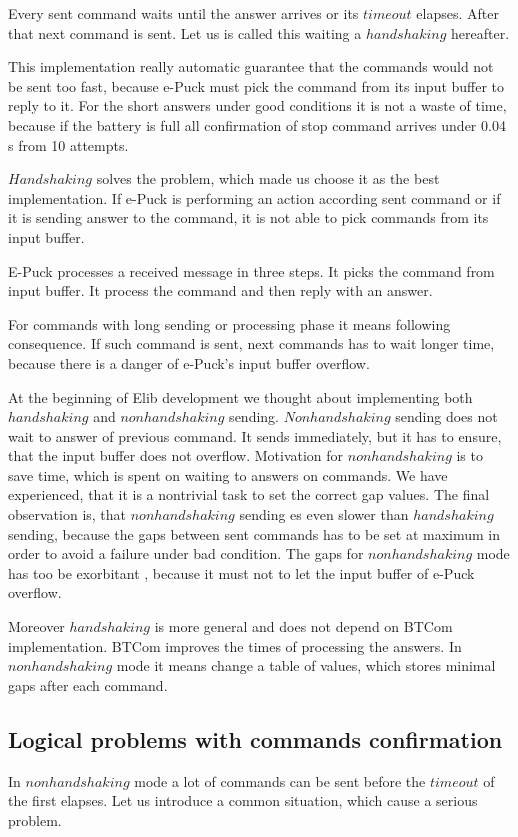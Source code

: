 	Every sent command waits until the answer arrives or its $timeout$ elapses.
	After that next command is sent. Let us is called this waiting a $handshaking$ hereafter.

	This implementation really automatic guarantee that the commands would not be sent too fast,
	because e-Puck must pick the command from its input buffer to reply to it.
	For the short answers under good conditions it is not a waste of time, because
	if the battery is full all confirmation of stop command arrives under 0.04 s from 10 attempts.

	$Handshaking$ solves the problem, which made us choose it as the best implementation.
	If e-Puck is performing an action according sent command or if it is sending answer to the command,
	it is not able to pick commands from its input buffer.

	E-Puck processes a received message in three steps. It picks the command from input buffer.
	It process the command and then reply with an answer.

	For commands with long sending or processing phase it means following consequence.
	If such command is sent, next commands has to wait longer time, because there is a
	danger of e-Puck's input buffer overflow.

	At the beginning of Elib development we thought about implementing both $handshaking$
	and $nonhandshaking$ sending.
	$Nonhandshaking$ sending does not wait to answer of previous command. It sends immediately, but 
	it has to ensure, that the input buffer does not overflow.
	Motivation for $nonhandshaking$ is to save time, which is spent on waiting to answers on commands.
	We have experienced, that it is a nontrivial task to set the correct gap values. The final observation is, that 
	$nonhandshaking$ sending es even slower than $handshaking$ sending, because the gaps between sent commands
	has to be set at maximum in order to avoid a failure under bad condition. 
	The gaps for $nonhandshaking$ mode has too be exorbitant %
	, because it must not to let the input buffer of e-Puck overflow.

	Moreover $handshaking$ is more general
	and does not depend on BTCom implementation. BTCom improves the times of processing the answers.
	In $nonhandshaking$ mode it means change a table of values, which stores minimal gaps after each command.



	\subsection{Logical problems with commands confirmation}\label{sec:logical}
	In $nonhandshaking$ mode a lot of commands can be sent before the $timeout$ of the first elapses.
	Let us introduce a common situation, which cause a serious problem. 
	
